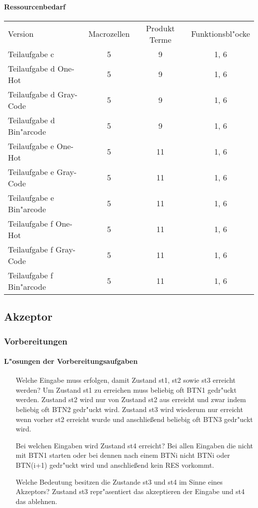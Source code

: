 \documentclass [] {scrartcl}
\begin{document}
  \paragraph{Ressourcenbedarf}
  \begin{table}
    \begin{tabular}{lccc}
      Version & Macrozellen & Produkt Terme & Funktionsbl"ocke\\
      Teilaufgabe c & 5 & 9 & 1, 6\\
      Teilaufgabe d One-Hot & 5 & 9 & 1, 6\\
      Teilaufgabe d Gray-Code & 5 & 9 & 1, 6\\
      Teilaufgabe d Bin"arcode & 5 & 9 & 1, 6\\
      Teilaufgabe e One-Hot & 5 & 11 & 1, 6\\
      Teilaufgabe e Gray-Code & 5 & 11 & 1, 6\\
      Teilaufgabe e Bin"arcode & 5 & 11 & 1, 6\\
      Teilaufgabe f One-Hot & 5 & 11 & 1, 6\\
      Teilaufgabe f Gray-Code & 5 & 11 & 1, 6\\
      Teilaufgabe f Bin"arcode & 5 & 11 & 1, 6\\
    \end{tabular}
  \end{table}
  \subsection{Akzeptor}
  \subsubsection{Vorbereitungen}
  \paragraph{L"osungen der Vorbereitungsaufgaben}
  \begin{itemize}
    \item[Welche Eingabe muss erfolgen, damit Zustand st1, st2 sowie st3 erreicht werden?] 
    Um Zustand st1 zu erreichen muss beliebig oft BTN1 gedr"uckt werden.
    Zustand st2 wird nur von Zustand st2 aus erreicht und zwar indem beliebig oft BTN2 gedr"uckt wird.
    Zustand st3 wird wiederum nur erreicht wenn vorher st2 erreicht wurde und anschließend beliebig oft BTN3 gedr"uckt wird.
    \item[Bei welchen Eingaben wird Zustand st4 erreicht?]
    Bei allen Eingaben die nicht mit BTN1 starten oder bei dennen nach einem BTNi nicht BTNi oder BTN(i+1) gedr"uckt wird und anschließend kein RES vorkommt.
   \item[Welche Bedeutung besitzen die Zustande st3 und st4 im Sinne eines Akzeptors?]
   Zustand st3 repr"asentiert das akzeptieren der Eingabe und st4 das ablehnen.
  \end{itemize}
\end{document}
